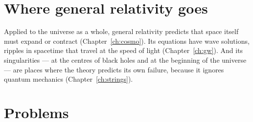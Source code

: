 \section{Where general relativity goes}

Applied to the universe as a whole, general relativity predicts that space itself must expand or contract (Chapter~\ref{ch:cosmo}). Its equations have wave solutions, ripples in spacetime that travel at the speed of light (Chapter~\ref{ch:gw}). And its singularities --- at the centres of black holes and at the beginning of the universe --- are places where the theory predicts its own failure, because it ignores quantum mechanics (Chapter~\ref{ch:strings}).

\section{Problems}


